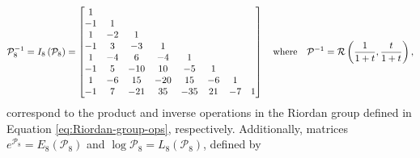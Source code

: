 \begin{example}
\begin{displaymath}
\mathcal{P}_{8}^{-1} = I_{8}\left( \mathcal{P}_{8}\right) = \left[\begin{matrix}1 &   &   &   &   &   &   &  \\-1 & 1 &   &   &   &   &   &  \\1 & -2 & 1 &   &   &   &   &  \\-1 & 3 & -3 & 1 &   &   &   &  \\1 & -4 & 6 & -4 & 1 &   &   &  \\-1 & 5 & -10 & 10 & -5 & 1 &   &  \\1 & -6 & 15 & -20 & 15 & -6 & 1 &  \\-1 & 7 & -21 & 35 & -35 & 21 & -7 & 1\end{matrix}\right]
\quad\text{where}\quad\mathcal{P}^{-1} = \mbox{$\mathcal{R}$}\left(\frac{1}{1+t},\frac{t}{1+t} \right),
\end{displaymath}
correspond to the product and inverse operations in the Riordan group defined
in Equation \ref{eq:Riordan-group-ops}, respectively. Additionally, matrices
$e^{\mathcal{P}_{8}}= E_{8}\left( \mathcal{P}_{8}\right) $ and
$\log{\mathcal{P}_{8}}= L_{8}\left( \mathcal{P}_{8}\right) $, defined by
\begin{displaymath}

\end{displaymath}
\end{example}
